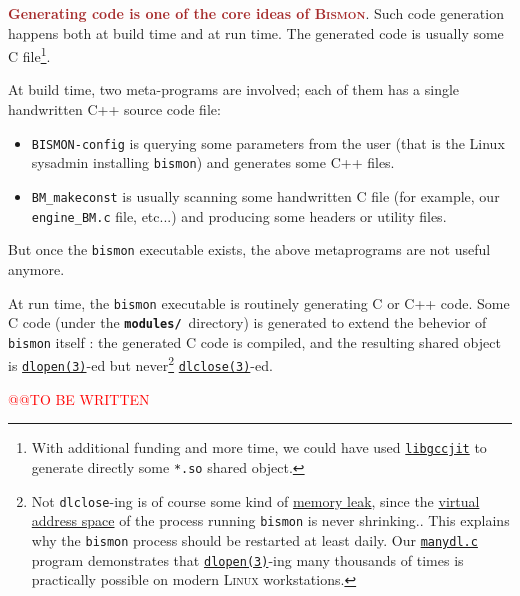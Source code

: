 \textcolor{brown}{\textbf{Generating code is one of the core ideas of \textsc{Bismon}}}. Such code
generation happens both at build time and at run time. The generated
code is usually some C file\footnote{With additional funding and more
time, we could have used
\href{https://gcc.gnu.org/onlinedocs/jit/}{\texttt{libgccjit}} to
generate directly some \texttt{*.so} shared object.}.

At build time, two meta-programs are involved; each of them has a
single handwritten C++ source code file:

\begin{itemize}
  \item \texttt{BISMON-config}
     is
    querying some parameters from the user (that is the Linux sysadmin
    installing \texttt{bismon}) and generates some C++ files.

  \item \texttt{BM\_makeconst}
     is usually
    scanning some handwritten C file (for example, our
    \texttt{engine\_BM.c} file, etc...)  and producing some headers or
    utility files.
\end{itemize}

But once the \texttt{bismon} executable exists, the above metaprograms
are not useful anymore.

At run time, the \texttt{bismon} executable is routinely generating C
or C++ code. Some C code (under the \textbf{\texttt{modules/}}\,
directory) is generated to extend the behevior of \texttt{bismon}
itself : the generated C code is compiled, and the resulting shared
object is
\href{https://man7.org/linux/man-pages/man3/dlopen.3.html}{\texttt{dlopen(3)}}-ed
but never\footnote{Not \texttt{dlclose}-ing is of course some kind of
\href{https://en.wikipedia.org/wiki/Memory_leak}{memory leak}, since
the \href{https://en.wikipedia.org/wiki/Virtual_address_space}{virtual
  address space} of the process running \texttt{bismon} is never
shrinking.. This explains why the \texttt{bismon} process should be
restarted at least daily.  Our
\href{https://github.com/bstarynk/misc-basile/blob/master/manydl.c}{\texttt{manydl.c}}
program demonstrates that
\href{https://man7.org/linux/man-pages/man3/dlopen.3.html}{\texttt{dlopen(3)}}-ing
many thousands of times is practically possible on modern
\textsc{Linux} workstations.}
\href{https://man7.org/linux/man-pages/man3/dlclose.3.html}{\texttt{dlclose(3)}}-ed.

{\textcolor{red}{\large @@TO BE WRITTEN}}
